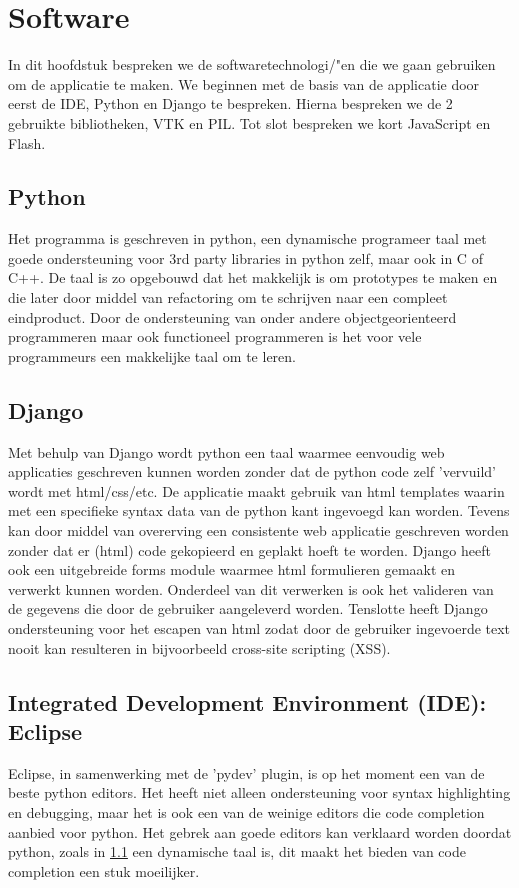 \section{Software}
\label{Software}
In dit hoofdstuk bespreken we de softwaretechnologi/"{e}n die we gaan gebruiken om de applicatie te maken. 
We beginnen met de basis van de applicatie door eerst de IDE, Python en Django te bespreken. 
Hierna bespreken we de 2 gebruikte bibliotheken, VTK en PIL. 
Tot slot bespreken we kort JavaScript en Flash.

\subsection{Python}
\label{software_python}
Het programma is geschreven in python, een dynamische programeer taal met goede ondersteuning voor 3rd party libraries in python zelf, maar ook in C of C++. De taal is zo opgebouwd dat het makkelijk is om prototypes te maken en die later door middel van refactoring om te schrijven naar een compleet eindproduct. Door de ondersteuning van onder andere objectgeorienteerd programmeren maar ook functioneel programmeren is het voor vele programmeurs een makkelijke taal om te leren.

\subsection{Django}
Met behulp van Django wordt python een taal waarmee eenvoudig web applicaties geschreven kunnen worden zonder dat de python code zelf 'vervuild' wordt met html/css/etc. De applicatie maakt gebruik van html templates waarin met een specifieke syntax data van de python kant ingevoegd kan worden. Tevens kan door middel van overerving een consistente web applicatie geschreven worden zonder dat er (html) code gekopieerd en geplakt hoeft te worden. Django heeft ook een uitgebreide forms module waarmee html formulieren gemaakt en verwerkt kunnen worden. Onderdeel van dit verwerken is ook het valideren van de gegevens die door de gebruiker aangeleverd worden. Tenslotte heeft Django ondersteuning voor het escapen van html zodat door de gebruiker ingevoerde text nooit kan resulteren in bijvoorbeeld cross-site scripting (XSS).

\subsection{Integrated Development Environment (IDE): Eclipse}
Eclipse, in samenwerking met de 'pydev' plugin, is op het moment een van de beste python editors. Het heeft niet alleen ondersteuning voor syntax highlighting en debugging, maar het is ook een van de weinige editors die code completion aanbied voor python. Het gebrek aan goede editors kan verklaard worden doordat python, zoals in \ref{software_python} een dynamische taal is, dit maakt het bieden van code completion een stuk moeilijker.

